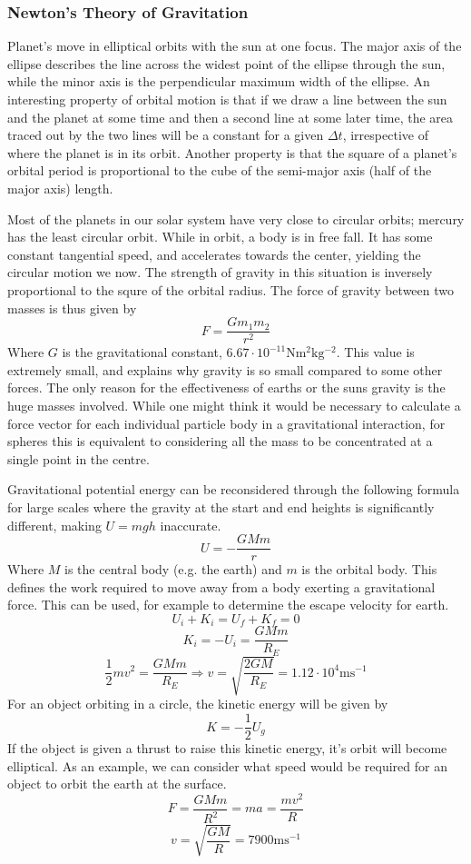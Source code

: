 \documentclass[12pt]{report}
\begin{document}
\begin{flushleft}
\subsubsection*{Newton's Theory of Gravitation}
Planet's move in elliptical orbits with the sun at one focus. The major axis of
the ellipse describes the line across the widest point of the ellipse through 
the sun, while the minor axis is the perpendicular maximum width of the 
ellipse. An interesting property of orbital motion is that if we draw a line 
between the sun and the planet at some time and then a second line at some 
later time, the area traced out by the two lines will be a constant for a given
\(\Delta t\), irrespective of where the planet is in its orbit. Another 
property is that the square of a planet's orbital period is proportional to the
cube of the semi-major axis (half of the major axis) length.

\bigskip
Most of the planets in our solar system have very close to circular orbits; 
mercury has the least circular orbit. While in orbit, a body is in free fall. 
It has some constant tangential speed, and accelerates towards the center,
yielding the circular motion we now. The strength of gravity in this situation
is inversely proportional to the squre of the orbital radius. The force of
gravity between two masses is thus given by
\[F = \frac{Gm_1m_2}{r^2}\]
Where \(G\) is the gravitational constant, 
\(6.67\cdot10^{-11}\mathrm{Nm^2kg^{-2}}\). This value is extremely small, and
explains why gravity is so small compared to some other forces. The only 
reason for the effectiveness of earths or the suns gravity is the huge masses
involved. While one might think it would be necessary to calculate a force 
vector for each individual particle body in a gravitational interaction, for
spheres this is equivalent to considering all the mass to be concentrated at
a single point in the centre.

\bigskip
Gravitational potential energy can be reconsidered through the following 
formula for large scales where the gravity at the start and end heights is
significantly different, making \(U = mgh\) inaccurate.
\[U = -\frac{GMm}{r}\]
Where \(M\) is the central body (e.g. the earth) and \(m\) is the orbital
body. This defines the work required to move away from a body exerting a 
gravitational force. This can be used, for example to determine the escape
velocity for earth.
\[U_i + K_i = U_f + K_f = 0\]
\[K_i = -U_i = \frac{GMm}{R_E}\]
\[\frac{1}{2}mv^2 = \frac{GMm}{R_E} \Rightarrow v = \sqrt{\frac{2GM}{R_E}} = 
1.12\cdot10^4\mathrm{ms}^{-1}\]
For an object orbiting in a circle, the kinetic energy will be given by
\[K = -\frac{1}{2}U_g\]
If the object is given a thrust to raise this kinetic energy, it's orbit
will become elliptical. As an example, we can consider what speed would
be required for an object to orbit the earth at the surface.
\[F = \frac{GMm}{R^2} = ma = \frac{mv^2}{R}\]
\[v = \sqrt{\frac{GM}{R}} = 7900\mathrm{ms}^{-1}\]


\end{flushleft}
\end{document}
